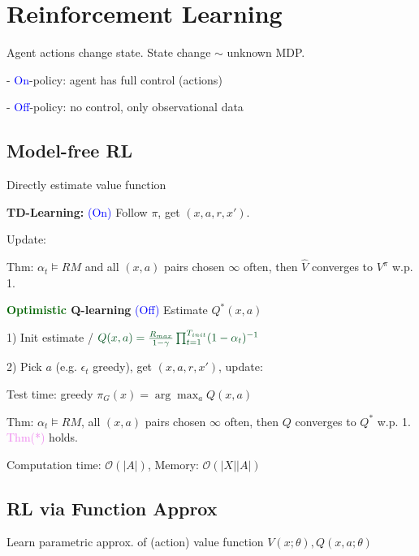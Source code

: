 \section{Reinforcement Learning}

 Agent actions change state. State change $\sim$ unknown MDP.

- \textcolor{blue}{On}-policy: agent has full control (actions)

- \textcolor{blue}{Off}-policy: no control, only observational data 


\vspace*{1mm}
\subsection*{Model-free RL} {\fontsize{9.5}{6}\selectfont Directly estimate value function}

\textbf{TD-Learning:} {\fontsize{9}{6}\selectfont \textcolor{blue}{(On)}} Follow $\pi$, get $(x,a,r,x')$. 

Update: 

Thm: $\alpha_t \vDash RM$ and all $(x,a)$ pairs chosen $\infty$ often, then $\hat{V}$ converges to $V^\pi$ w.p. 1.


\textbf{\textcolor{darkgreen}{Optimistic} Q-learning} {\fontsize{9}{6}\selectfont \textcolor{blue}{(Off)}} Estimate $Q^*(x,a)$

1) Init estimate / $\textcolor{darkgreen}{Q(x,a) = \frac{R_{max}}{1 - \gamma} \prod_{t=1}^{T_{init}} (1 - \alpha_t)^{-1}}$

2) Pick $a$ (e.g. $\epsilon_t$ greedy), get $(x,a,r,x')$, update: 

Test time: greedy $\pi_G(x) = \arg\max_a Q(x,a)$

Thm: $\alpha_t \vDash RM$, all $(x,a)$ pairs chosen $\infty$ often, then $Q$ converges to $Q^*$ w.p. 1. \textcolor{violet}{Thm(*)} holds.

Computation time: $\mathcal{O}(|A|)$, Memory: $\mathcal{O}(|X||A|)$


\subsection*{RL via Function Approx} {\fontsize{9.5}{6}\selectfont Learn parametric approx. of (action) value function $V(x; \theta), Q(x,a;\theta)$}

